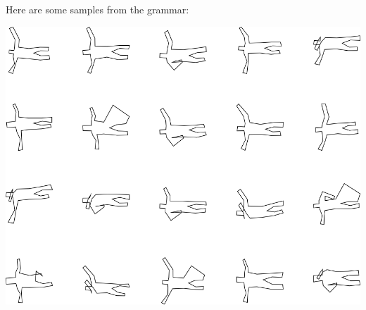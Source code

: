 Here are some samples from the grammar:

\includegraphics[width=6in]{output/3.learning/incremental/gram.17.d/samples.png}

